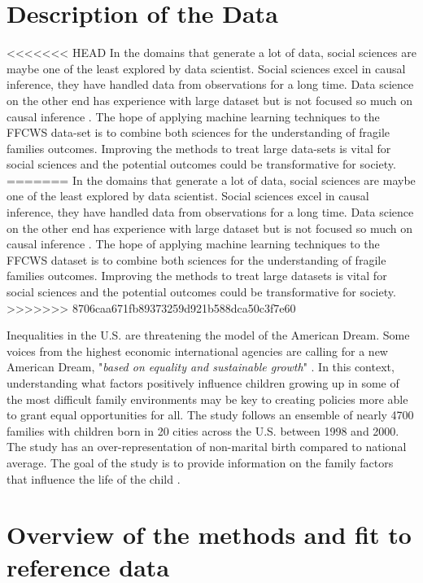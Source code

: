 \documentclass{article} %
\begin{document}
\section{Description of the Data}
<<<<<<< HEAD
In the domains that generate a lot of data, social sciences are maybe one of the least explored by data scientist. Social sciences excel in causal inference, they have handled data from observations for a long time. Data science on the other end has experience with large dataset but is not focused so much on causal inference \cite{grimmer2015we}. The hope of applying machine learning techniques to the FFCWS data-set is to combine both sciences for the understanding of fragile families outcomes. Improving the methods to treat large data-sets is vital for social sciences and the potential outcomes could be transformative for society.
=======
In the domains that generate a lot of data, social sciences are maybe one of the least explored by data scientist. Social sciences excel in causal inference, they have handled data from observations for a long time. Data science on the other end has experience with large dataset but is not focused so much on causal inference \cite{grimmer2015we}. The hope of applying machine learning techniques to the FFCWS dataset is to combine both sciences for the understanding of fragile families outcomes. Improving the methods to treat large datasets is vital for social sciences and the potential outcomes could be transformative for society.
>>>>>>> 8706caa671fb89373259d921b588dca50c3f7e60

Inequalities in the U.S. are threatening the model of the American Dream. Some voices from the highest economic international agencies are calling for a new American Dream, "\textit{based on equality and sustainable growth}" \cite{wef2017}. In this context, understanding what factors positively influence children growing up in some of the most difficult family environments may be key to creating policies more able to grant equal opportunities for all. The study follows an ensemble of nearly 4700 families with children born in 20 cities across the U.S. between 1998 and 2000. The study has an over-representation of non-marital birth compared to national average. The goal of the study is to provide information on the family factors that influence the life of the child  \cite{reichman2001fragile}.


\section{Overview of the methods and fit to reference data}
\end{document}
